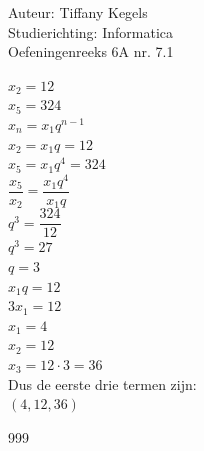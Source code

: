 \documentclass[a4paper]{article}
\begin{document}
  
\noindent \large Auteur: Tiffany Kegels \\
\noindent \large Studierichting: Informatica\\
\noindent \large Oefeningenreeks 6A nr. 7.1\\

\medskip

\normalsize


$x_2 =12$\\

$x_5 = 324$\\

$x_n = x_1q^{n-1}$\\

$x_2 = x_1q = 12$\\

$x_5 = x_1q^4 = 324$\\

$\dfrac{x_5}{x_2}=\dfrac{x_1q^4}{x_1q}$\\

$q^3 = \dfrac{324}{12}$\\

$q^3 = 27$\\

$q = 3$\\

$x_1q = 12$\\

$3x_1 = 12$\\

$x_1 = 4$\\

$x_2 = 12$\\

$x_3 = 12\cdot3 = 36$\\

Dus de eerste drie termen zijn:\\

$(4,12,36)$


\begin{thebibliography}{999}

\end{thebibliography}
\end{document}
